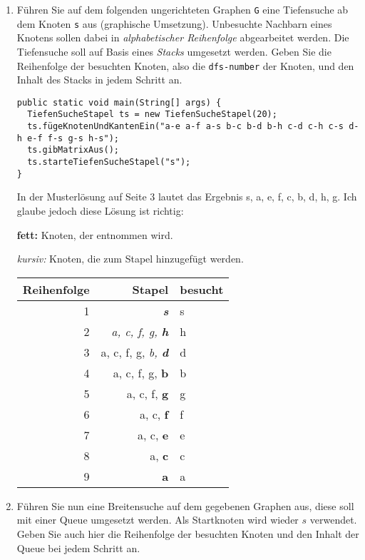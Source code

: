 \documentclass{lehramt-informatik}
\begin{document}
\begin{enumerate}


\item Führen Sie auf dem folgenden ungerichteten Graphen \texttt{G} eine
Tiefensuche ab dem Knoten \texttt{s} aus (graphische Umsetzung).
Unbesuchte Nachbarn eines Knotens sollen dabei in \emph{alphabetischer
Reihenfolge} abgearbeitet werden. Die Tiefensuche soll auf Basis eines
\emph{Stacks} umgesetzt werden. Geben Sie die Reihenfolge der besuchten
Knoten, also die \texttt{dfs-number} der Knoten, und den Inhalt des
Stacks in jedem Schritt an.

\begin{verbatim}
public static void main(String[] args) {
  TiefenSucheStapel ts = new TiefenSucheStapel(20);
  ts.fügeKnotenUndKantenEin("a-e a-f a-s b-c b-d b-h c-d c-h c-s d-h e-f f-s g-s h-s");
  ts.gibMatrixAus();
  ts.starteTiefenSucheStapel("s");
}
\end{verbatim}

\begin{antwort}
In der Musterlösung auf Seite 3 lautet das Ergebnis s, a, e, f, c, b, d, h, g.
Ich glaube jedoch diese Lösung ist richtig:

\textbf{fett:} Knoten, der entnommen wird.

\textit{kursiv:} Knoten, die zum Stapel hinzugefügt werden.

\begin{tabular}{|r|r|l|}
\hline
\textbf{Reihenfolge} & \textbf{Stapel} & \textbf{besucht} \\\hline\hline
1 & \textit{\textbf{s}} & s \\\hline
2 & \textit{a, c, f, g, \textbf{h}} & h \\\hline
3 & a, c, f, g, \textit{b, \textbf{d}} & d \\\hline
4 & a, c, f, g, \textbf{b} & b \\\hline
5 & a, c, f, \textbf{g} & g \\\hline
6 & a, c, \textbf{f} & f \\\hline
7 & a, c, \textbf{e} & e \\\hline
8 & a, \textbf{c} & c \\\hline
9 & \textbf{a} & a \\\hline
\end{tabular}
\end{antwort}


\item Führen Sie nun eine Breitensuche auf dem gegebenen Graphen aus,
diese soll mit einer Queue umgesetzt werden. Als Startknoten wird wieder
$s$ verwendet. Geben Sie auch hier die Reihenfolge der besuchten Knoten
und den Inhalt der Queue bei jedem Schritt an.


\end{enumerate}
\end{document}
